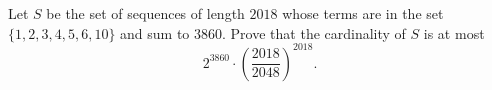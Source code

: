 Let $S$ be the set of sequences of length $2018$ whose terms  are in the set $\{1,2,3,4,5,6,10\}$ and sum to $3860$.
Prove that the cardinality of $S$ is at most
\[
2^{3860} \cdot \left( \frac{2018}{2048} \right)^{2018}.
\]
